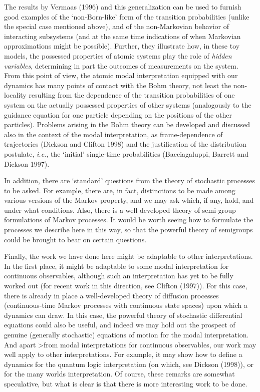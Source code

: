 \documentclass[12pt]{article}
\newcommand{\ie}{{\it i.e.}}         %
\begin{document}
The results by Vermaas (1996) and this generalization can be used to 
furnish good examples of the `non-Born-like' form of the transition 
probabilities (unlike the special case mentioned above), and of the 
non-Markovian behavior of interacting subsystems (and at the same time 
indications of when Markovian approximations might be possible).  
Further, they illustrate how, in these toy models, the possessed 
properties of atomic systems play the role of {\em hidden variables}, 
determining in part the outcomes of measurements on the system.  From 
this point of view, the atomic modal interpretation equipped with our 
dynamics has many points of contact with the Bohm theory, not least 
the non-locality resulting from the dependence of the transition 
probabilities of one system on the actually possessed properties of 
other systems (analogously to the guidance equation for one particle 
depending on the positions of the other particles).  Problems arising 
in the Bohm theory can be developed and discussed also in the context 
of the modal interpretation, as frame-dependence of trajectories 
(Dickson and Clifton 1998) and the justification of the distribution 
postulate, \ie, the `initial' single-time probabilities 
(Bacciagaluppi, Barrett and Dickson 1997).

In addition, there are `standard' questions from the theory of 
stochastic processes to be asked.  For example, there are, in fact, 
distinctions to be made among various versions of the Markov property, 
and we may ask which, if any, hold, and under what conditions.  Also, 
there is a well-developed theory of semi-group formulations of Markov 
processes.  It would be worth seeing how to formulate the processes we 
describe here in this way, so that the powerful theory of semigroups 
could be brought to bear on certain questions.

Finally, the work we have done here might be adaptable to other 
interpretations.  In the first place, it might be adaptable to some 
modal interpretation for continuous observables, although such an 
interpretation has yet to be fully worked out (for recent work in this 
direction, see Clifton (1997)).  For this case, there is already in 
place a well-developed theory of diffusion processes (continuous-time 
Markov processes with continuous state spaces) upon which a dynamics 
can draw.  In this case, the powerful theory of stochastic 
differential equations could also be useful, and indeed we may hold 
out the prospect of genuine (generally stochastic) equations of motion 
for the modal interpretation.  And apart >from modal interpretations 
for continuous observables, our work may well apply to other 
interpretations.  For example, it may show how to define a dynamics 
for the quantum logic interpretation (on which, see Dickson (1998)), 
or for the many worlds interpretation.  Of course, these remarks are 
somewhat speculative, but what is clear is that there is more 
interesting work to be done.
\end{document}
